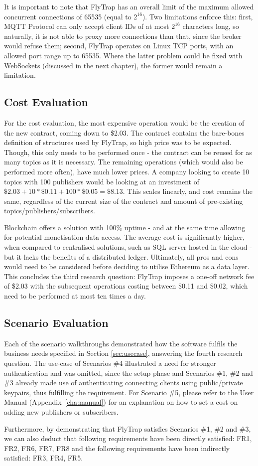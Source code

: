 It is important to note that FlyTrap has an overall limit of the maximum allowed concurrent connections of 65535 (equal to $2^{16}$). Two limitations enforce this: first, MQTT Protocol can only accept client IDs of at most $2^{16}$ characters long, so naturally, it is not able to proxy more connections than that, since the broker would refuse them; second, FlyTrap operates on Linux TCP ports, with an allowed port range up to 65535. Where the latter problem could be fixed with WebSockets (discussed in the next chapter), the former would remain a limitation.
\subsection{Cost Evaluation}
For the cost evaluation, the most expensive operation would be the creation of the new contract, coming down to \$2.03. The contract contains the bare-bones definition of structures used by FlyTrap, so high price was to be expected. Though, this only needs to be performed once - the contract can be reused for as many topics as it is necessary. The remaining operations (which would also be performed more often), have much lower prices. A company looking to create 10 topics with 100 publishers would be looking at an investment of $\$2.03 + 10 * \$0.11 + 100 * \$0.05 = \$8.13$. This scales linearly, and cost remains the same, regardless of the current size of the contract and amount of pre-existing topics/publishers/subscribers.

Blockchain offers a solution with 100\% uptime - and at the same time allowing for potential monetisation data access. The average cost is significantly higher, when compared to centralised solutions, such as SQL server hosted in the cloud - but it lacks the benefits of a distributed ledger. Ultimately, all pros and cons would need to be considered before deciding to utilise Ethereum as a data layer. This concludes the third research question: FlyTrap imposes a one-off network fee of \$2.03 with the subsequent operations costing between \$0.11 and \$0.02, which need to be performed at most ten times a day.
\subsection{Scenario Evaluation}
Each of the scenario walkthroughs demonstrated how the software fulfils the business needs specified in Section \ref{sec:usecase}, answering the fourth research question. The use-case of Scenarios \#4 illustrated a need for stronger authentication and was omitted, since the setup phase and Scenarios \#1, \#2 and \#3 already made use of authenticating connecting clients using public/private keypairs, thus fulfilling the requirement. For Scenario \#5, please refer to the User Manual (Appendix~\ref{cha:manual}) for an explanation on how to set a cost on adding new publishers or subscribers.

Furthermore, by demonstrating that FlyTrap satisfies Scenarios \#1, \#2 and \#3, we can also deduct that following requirements have been directly satisfied: FR1, FR2, FR6, FR7, FR8 and the following requirements have been indirectly satisfied: FR3, FR4, FR5. 
